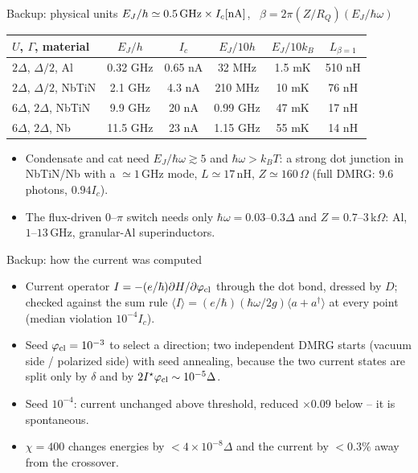 \documentclass[aspectratio=169,10pt]{beamer}
\newcommand{\hw}{\hbar\omega}
\newcommand{\pcl}{\varphi_{\rm cl}}
\begin{document}
\appendix
\begin{frame}{Backup: physical units}
  \centering\small
  $E_J/h\simeq0.5\,{\rm GHz}\times I_c[{\rm nA}]$, \ $\beta=2\pi(Z/R_Q)(E_J/\hw)$\\[2mm]
  \begin{tabular}{@{}lccccc@{}}
    \toprule
    $U$, $\Gamma$, material & $E_J/h$ & $I_c$ & $E_J/10h$ & $E_J/10k_B$ & $L_{\beta=1}$\\ \midrule
    $2\Delta$, $\Delta/2$, Al & 0.32 GHz & 0.65 nA & 32 MHz & 1.5 mK & 510 nH\\
    $2\Delta$, $\Delta/2$, NbTiN & 2.1 GHz & 4.3 nA & 210 MHz & 10 mK & 76 nH\\
    $6\Delta$, $2\Delta$, NbTiN & 9.9 GHz & 20 nA & 0.99 GHz & 47 mK & 17 nH\\
    $6\Delta$, $2\Delta$, Nb & 11.5 GHz & 23 nA & 1.15 GHz & 55 mK & 14 nH\\ \bottomrule
  \end{tabular}
  \par\vspace{3mm}
  \begin{itemize}\small
    \item Condensate and cat need $E_J/\hw\gtrsim5$ and $\hw>k_BT$: a strong dot junction in NbTiN/Nb with a $\simeq1\,$GHz mode,
          $L\simeq17\,$nH, $Z\simeq160\,\Omega$ (full DMRG: $9.6$ photons, $0.94I_c$).
    \item The flux-driven $0$--$\pi$ switch needs only $\hw=0.03$--$0.3\Delta$ and $Z=0.7$--$3\,$k$\Omega$: Al, $1$--$13$\,GHz, granular-Al superinductors.
  \end{itemize}
\end{frame}

\begin{frame}{Backup: how the current was computed}
  \begin{itemize}
    \item Current operator $I=-(e/\hbar)\partial H/\partial\pcl$ through the dot bond, dressed by $D$; checked against the sum rule
          $\langle I\rangle=(e/\hbar)(\hw/2g)\langle a+a^\dagger\rangle$ at every point (median violation $10^{-4}I_c$).
    \item Seed $\pcl=10^{-3}$ to select a direction; two independent DMRG starts (vacuum side / polarized side) with seed
          annealing, because the two current states are split only by $\delta$ and by $2I^\star\pcl\sim10^{-5}\Delta$.
    \item Seed $10^{-4}$: current unchanged above threshold, reduced $\times0.09$ below -- it is spontaneous.
    \item $\chi=400$ changes energies by $<4\times10^{-8}\Delta$ and the current by $<0.3\%$ away from the crossover.
  \end{itemize}
\end{frame}
\end{document}
